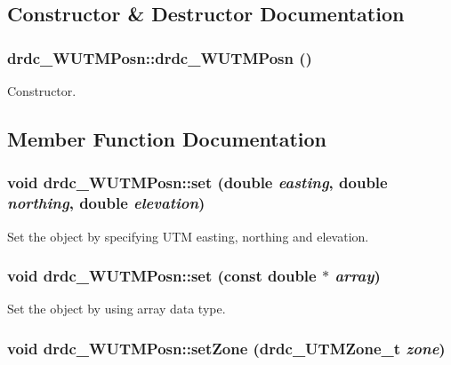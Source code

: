 \subsection{Constructor \& Destructor Documentation}
\hypertarget{classdrdc__WUTMPosn_53156834afa26149ee93315c8fe40941}{
\subsubsection[drdc\_\-WUTMPosn]{\setlength{\rightskip}{0pt plus 5cm}drdc\_\-WUTMPosn::drdc\_\-WUTMPosn ()}}
\label{classdrdc__WUTMPosn_53156834afa26149ee93315c8fe40941}


Constructor. 



\subsection{Member Function Documentation}
\hypertarget{classdrdc__WUTMPosn_b1cad0ece4e461064de5c8b0da95306f}{
\subsubsection[set]{\setlength{\rightskip}{0pt plus 5cm}void drdc\_\-WUTMPosn::set (double {\em easting}, \/  double {\em northing}, \/  double {\em elevation})}}
\label{classdrdc__WUTMPosn_b1cad0ece4e461064de5c8b0da95306f}


Set the object by specifying UTM easting, northing and elevation. 

\hypertarget{classdrdc__WUTMPosn_96108ff7b3bbb32f5142b0c2c8ce616f}{
\subsubsection[set]{\setlength{\rightskip}{0pt plus 5cm}void drdc\_\-WUTMPosn::set (const double $\ast$ {\em array})}}
\label{classdrdc__WUTMPosn_96108ff7b3bbb32f5142b0c2c8ce616f}


Set the object by using array data type. 

\hypertarget{classdrdc__WUTMPosn_ac0d6c2ca71999b6ad63740888e061a4}{
\subsubsection[setZone]{\setlength{\rightskip}{0pt plus 5cm}void drdc\_\-WUTMPosn::setZone ({\bf drdc\_\-UTMZone\_\-t} {\em zone})}}
\label{classdrdc__WUTMPosn_ac0d6c2ca71999b6ad63740888e061a4}


